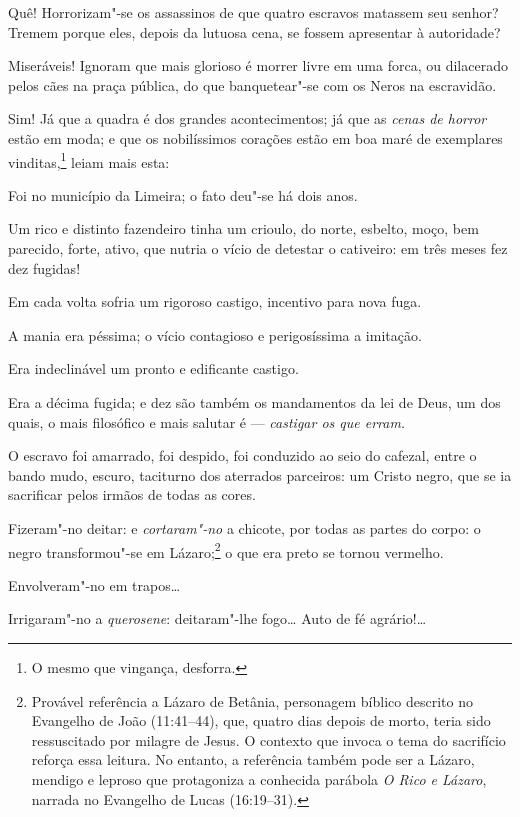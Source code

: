 Quê! Horrorizam"-se os assassinos de que quatro escravos matassem seu
senhor? Tremem porque eles, depois da lutuosa cena, se fossem apresentar
à autoridade?

Miseráveis! Ignoram que mais glorioso é morrer livre em uma forca, ou
dilacerado pelos cães na praça pública, do que banquetear"-se com os
Neros na escravidão.

Sim! Já que a quadra é dos grandes acontecimentos; já que as \emph{cenas
de horror} estão em moda; e que os nobilíssimos corações estão em boa
maré de exemplares vinditas,\footnote{O mesmo que vingança, desforra.}
leiam mais esta:

Foi no município da Limeira; o fato deu"-se há dois anos.

Um rico e distinto fazendeiro tinha um crioulo, do norte, esbelto, moço,
bem parecido, forte, ativo, que nutria o vício de detestar o cativeiro:
em três meses fez dez fugidas!

Em cada volta sofria um rigoroso castigo, incentivo para nova fuga.

A mania era péssima; o vício contagioso e perigosíssima a imitação.

Era indeclinável um pronto e edificante castigo.

Era a décima fugida; e dez são também os mandamentos da lei de Deus, um
dos quais, o mais filosófico e mais salutar é --- \emph{castigar os que
erram.}

O escravo foi amarrado, foi despido, foi conduzido ao seio do cafezal,
entre o bando mudo, escuro, taciturno dos aterrados parceiros: um Cristo
negro, que se ia sacrificar pelos irmãos de todas as cores.

Fizeram"-no deitar: e \emph{cortaram"-no} a chicote, por todas as partes
do corpo: o negro transformou"-se em Lázaro;\footnote{Provável
  referência a Lázaro de Betânia, personagem bíblico descrito no
  Evangelho de João (11:41--44), que, quatro dias depois de morto, teria
  sido ressuscitado por milagre de Jesus. O contexto que invoca o tema
  do sacrifício reforça essa leitura. No entanto, a
  referência também pode ser a Lázaro, mendigo e leproso que protagoniza
  a conhecida parábola \emph{O Rico e Lázaro}, narrada no Evangelho de
  Lucas (16:19--31).} o que era preto se tornou vermelho.

Envolveram"-no em trapos\ldots{}

Irrigaram"-no a \emph{querosene}: deitaram"-lhe fogo\ldots{} Auto de fé
agrário!\ldots{}

